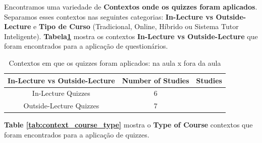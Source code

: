 Encontramos uma variedade de \textbf{Contextos onde os quizzes foram aplicados}. Separamos esses contextos nas seguintes categorias: \textbf{In-Lecture vs Outside-Lecture} e \textbf{Tipo de Curso} (Tradicional, Online, Híbrido ou Sistema Tutor Inteligente). \textbf{Tabela\ref{tab:context_in_vs_out}} mostra os contextos \textbf {In-Lecture vs Outside-Lecture} que foram encontrados para a aplicação de questionários.

\begin{table}[ht]
    \centering
        \caption{Contextos em que os quizzes foram aplicados: na aula x fora da aula}
        \begin{tabular}{c|c|c}
            \hline
                \textbf{In-Lecture vs Outside-Lecture} & \textbf{Number of Studies}  & \textbf{Studies} \\
            \hline
            \hline
                In-Lecture Quizzes &
                6 &
                \cite{petri_quality_2017, crow_intelligent_2018, acharya_infusing_2017, krugel_computational_2017, thevathayan_imparting_2017, wu_improvement_2011} \\
            \hline
                Outside-Lecture Quizzes &
                7 &
                \cite{figueiredo_evaluation_2014, coore_facilitating_2019, luxton-reilly_introductory_2018, ogawa_evaluation_2018, thevathayan_imparting_2017, herold_student_2012, verdu_distributed_2012} \\
            \hline
        \end{tabular}
    \label{tab:context_in_vs_out}
\end{table}

\textbf{Table \ref{tab:context_course_type}} mostra o \textbf{Type of Course} contextos que foram encontrados para a aplicação de quizzes.

